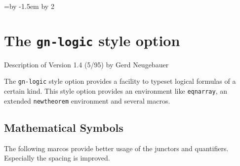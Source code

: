 

\setlength{\unitlength}{1pt}



\newlength{\Width} \Width=\textwidth \advance\Width by -1.5em \divide\Width by 2

\section{The {\tt gn-logic} style option}
Description of Version 1.4 (5/95) by Gerd Neugebauer \bigskip

The {\tt gn-logic} style option provides a facility to typeset logical
formulas of a certain kind. This style option provides an environment like
\verb|eqnarray|, an extended {\tt newtheorem} environment and several macros.



\subsection{Mathematical Symbols}

The following marcos provide better usage of the junctors and quantifiers.
Especially the spacing  is improved.


